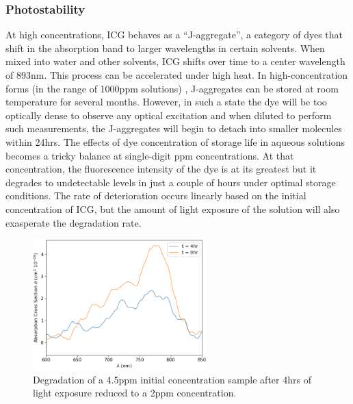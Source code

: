 \subsubsection{ Photostability}
At high concentrations, ICG behaves as a  ``J-aggregate'', a category of dyes that shift in the absorption band to larger wavelengths in certain solvents. When mixed into water and other solvents, ICG shifts over time to a center wavelength of 893nm. This process can be accelerated under high heat. In high-concentration forms (in the range of 1000ppm solutions) \cite{rotermund},  J-aggregates can be stored at room temperature for several months. However, in such a state the dye will be too optically dense to observe any optical excitation and when diluted to perform such measurements, the J-aggregates will begin to detach into smaller molecules within 24hrs.  The effects of dye concentration of storage life in aqueous solutions becomes a tricky balance at single-digit ppm concentrations. At that concentration, the fluorescence intensity of the dye is at its greatest but it degrades to undetectable levels in just a couple of hours under optimal storage conditions\cite{landsman, saxena}. The rate of deterioration occurs linearly based on the initial concentration of ICG\cite{holzer}, but the amount of light exposure of the solution will also exasperate the degradation rate\cite{saxena}. 
\begin{figure}[h]
	\centering
	\includegraphics[width=0.6\textwidth]{./Figures/ICG/abc_time.png}
	\caption{Degradation of a 4.5ppm initial concentration sample after 4hrs of light exposure reduced to a 2ppm concentration.}
	\label{fig:icgphoto}
\end{figure}
\clearpage


